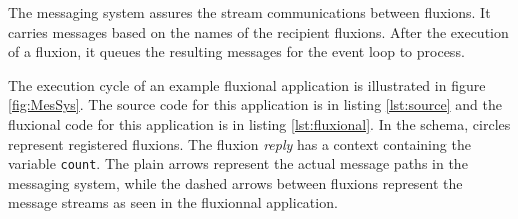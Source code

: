 
The messaging system assures the stream communications between fluxions.
It carries messages based on the names of the recipient fluxions.
After the execution of a fluxion, it queues the resulting messages for the event loop to process.







The execution cycle of an example fluxional application is illustrated in figure \ref{fig:MesSys}. The source code for this application is in listing \ref{lst:source} and the fluxional code for this application is in listing \ref{lst:fluxional}.
In the schema, circles represent registered fluxions.
The fluxion \textit{reply} has a context containing the variable \texttt{count}.
The plain arrows represent the actual message paths in the messaging system, while the dashed arrows between fluxions represent the message streams as seen in the fluxionnal application.

